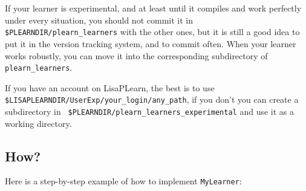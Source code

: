 \documentclass[11pt]{book}
\begin{document}
If your learner is experimental, and at least until it compiles and
work perfectly under every situation, you should not commit it in {\tt
\$PLEARNDIR/plearn\_learners} with the other ones, but it is still a
good idea to put it in the version tracking system, and to commit often.
When your learner works robustly, you can move it into the corresponding
subdirectory of {\tt plearn\_learners}.

If you have an account on LisaPLearn, the best is to use
{\tt \$LISAPLEARNDIR/UserExp/your\_login/any\_path},
if you don't you can create a subdirectory in {\tt
\$PLEARNDIR/plearn\_learners\_experimental} and use it as a working
directory.

\subsection{How?}

Here is a step-by-step example of how to implement {\tt MyLearner}:
\end{document}
